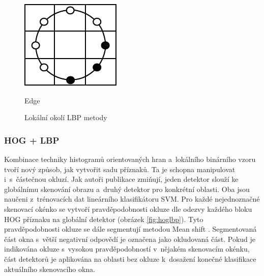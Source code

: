 \begin{figure}[H]
\begin{minipage}[b]{.18\textwidth}
  \includegraphics[width=.9\linewidth]{figures/lbp_edge}
  \caption*{Edge}
\end{minipage}
\caption{Lokální okolí LBP metody \cite{lbp:orig}}
\label{fig:lbpvzory}
\end{figure}

\subsubsection*{HOG + LBP}
Kombinace techniky histogramů orientovaných hran a~lokálního binárního vzoru tvoří nový způsob, jak vytvořit sadu příznaků. Ta je schopna manipulovat i~s~částečnou okluzí. Jak autoři publikace \cite{hoglpb} zmiňují, jeden detektor slouží ke globálnímu skenování obrazu a~druhý detektor pro konkrétní oblasti. Oba jsou naučeni z~trénovacích dat lineárního klasifikátoru SVM. Pro každé nejednoznačné skenovací okénko se vytvoří pravděpodobnosti okluze dle odezvy každého bloku HOG příznaku na globální detektor (obrázek \ref{fig:hoglbp}). Tyto pravděpodobnosti okluze se dále segmentují metodou Mean shift \cite{meanshift1} \cite{meanshift2}. Segmentovaná část okna s~větší negativní odpovědí je označena jako okludovaná část. Pokud je indikována okluze s~vysokou pravděpodobností v~nějakém skenovacím okénku, část detektorů je aplikována na oblasti bez okluze k~dosažení konečné klasifikace aktuálního skenovacího okna. 

